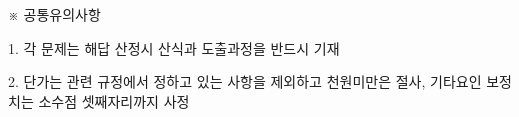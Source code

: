 \begin{framedtext}
※ 공통유의사항 \par
1. 각 문제는 해답 산정시 산식과 도출과정을 반드시 기재 \par
2. 단가는 관련 규정에서 정하고 있는 사항을 제외하고 천원미만은 절사, 기타요인 보정치는 소수점 셋째자리까지 사정 \par
\end{framedtext}
